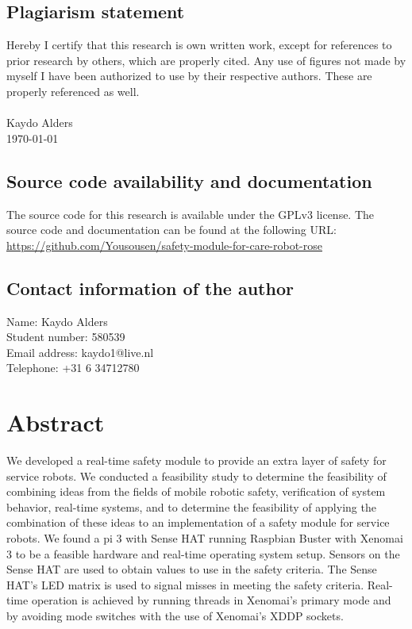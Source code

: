 \documentclass[12pt]{scrreprt}
\begin{document}
\newpage
\mbox{}
\vfill
\section*{Plagiarism statement}
Hereby I certify that this research is own written work, except for references to prior research by others, which are properly cited. Any use of figures not made by myself I have been authorized to use by their respective authors. These are properly referenced as well.\\\\
Kaydo Alders\\
\today

\section*{Source code availability and documentation}
The source code for this research is available under the GPLv3 license. The source code and documentation can be found at the following URL: \href{https://github.com/Yousousen/safety-module-for-care-robot-rose}{https://github.com/Yousousen/safety-module-for-care-robot-rose}

\section*{Contact information of the author}
Name: Kaydo Alders\\
Student number: 580539\\
Email address: kaydo1@live.nl\\
Telephone: +31 6 34712780\\

\newpage
\chapter*{Abstract}

We developed a real-time safety module to provide an extra layer of safety for service robots.
We conducted a feasibility study to determine the feasibility of combining ideas from the fields of mobile robotic safety, verification of system behavior, real-time systems, and to determine the feasibility of applying the combination of these ideas to an implementation of a safety module for service robots. We found a \gls{pi} 3 with Sense HAT running Raspbian Buster with Xenomai 3 to be a feasible hardware and real-time operating system setup. Sensors on the Sense HAT are used to obtain values to use in the safety criteria. The Sense HAT's LED matrix is used to signal misses in meeting the safety criteria. Real-time operation is achieved by running threads in Xenomai's primary mode and by avoiding mode switches with the use of Xenomai's XDDP sockets.
\end{document}
